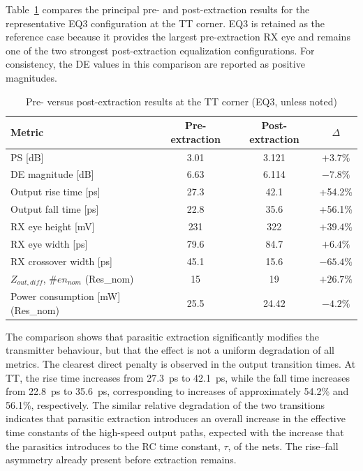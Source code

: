 Table~\ref{tab:pre_post_summary} compares the principal pre- and post-extraction results for the representative EQ3 configuration at the \ac{TT} corner. EQ3 is retained as the reference case because it provides the largest pre-extraction \ac{RX} eye and remains one of the two strongest post-extraction equalization configurations. For consistency, the \ac{DE} values in this comparison are reported as positive magnitudes.


\begin{table}[htbp]
 \centering
 \caption{Pre- versus post-extraction results at the \ac{TT} corner (EQ3, unless noted)}
 \label{tab:pre_post_summary}
 \begin{tabular}{lccc}
  \hline \hline
  \textbf{Metric} & \textbf{Pre-extraction} & \textbf{Post-extraction} & \textbf{$\Delta$} \\
  \hline
  \ac{PS} [dB]
  & 3.01 & 3.121 & $+3.7\%$ \\

  \ac{DE} magnitude [dB]
  & 6.63 & 6.114 & $-7.8\%$ \\

  Output rise time [ps]
  & 27.3 & 42.1 & +54.2\% \\

  Output fall time [ps]
  & 22.8 & 35.6 & +56.1\% \\

  \ac{RX} eye height [mV]
  & 231 & 322 & $+39.4\%$ \\

  \ac{RX} eye width [ps]
  & 79.6 & 84.7 & $+6.4\%$ \\

  \ac{RX} crossover width [ps]
  & 45.1 & 15.6 & $-65.4\%$ \\

  $Z_{out,diff}$, \#$en_{nom}$ (Res\_nom)
  & 15 & 19 & $+26.7\%$ \\

  Power consumption [mW] (Res\_nom)
  & 25.5 & 24.42 & $-4.2\%$ \\
  \hline \hline
 \end{tabular}
\end{table}

The comparison shows that parasitic extraction significantly modifies the transmitter behaviour, but that the effect is not a uniform degradation of all metrics. The clearest direct penalty is observed in the output transition times. At \ac{TT}, the rise time increases from 27.3~ps to 42.1~ps, while the fall time increases from 22.8~ps to 35.6~ps, corresponding to increases of approximately 54.2\% and 56.1\%, respectively. The similar relative degradation of the two transitions indicates that parasitic extraction introduces an overall increase in the effective time constants of the high-speed output paths, expected with the increase that the parasitics introduces to the RC time constant, $\tau$, of the nets. The rise--fall asymmetry already present before extraction remains.

